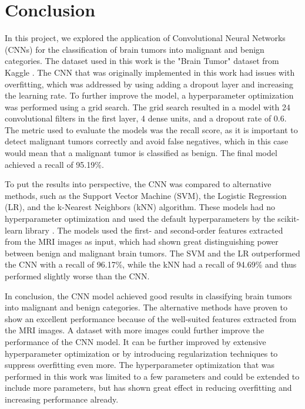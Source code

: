 \chapter{Conclusion}
\label{cha:conclusion}

In this project, we explored the application of Convolutional Neural Networks (CNNs) for the classification of brain tumors into malignant and benign categories.
The dataset used in this work is the "Brain Tumor" dataset from Kaggle \cite{jakesh_bohaju_2020}.
The CNN that was originally implemented in this work had issues with overfitting, which was addressed by using adding a dropout layer and increasing the learning rate.
To further improve the model, a hyperparameter optimization was performed using a grid search.
The grid search resulted in a model with 24 convolutional filters in the first layer, 4 dense units, and a dropout rate of 0.6.
The metric used to evaluate the models was the recall score, as it is important to detect malignant tumors correctly and avoid false negatives, which in this case would mean that a malignant tumor is classified as benign.
The final model achieved a recall of 95.19\%. \newline %

To put the results into perspective, the CNN was compared to alternative methods, such as the Support Vector Machine (SVM), the Logistic Regression (LR), and the k-Nearest Neighbors (kNN) algorithm.
These models had no hyperparameter optimization and used the default hyperparameters by the scikit-learn library \cite{scikit-learn}.
The models used the first- and second-order features extracted from the MRI images as input, which had shown great distinguishing power between benign and malignant brain tumors.
The SVM and the LR outperformed the CNN with a recall of 96.17\%, while the kNN had a recall of 94.69\% and thus performed slightly worse than the CNN.

In conclusion, the CNN model achieved good results in classifying brain tumors into malignant and benign categories.
The alternative methods have proven to show an excellent performance because of the well-suited features extracted from the MRI images.
A dataset with more images could further improve the performance of the CNN model.
It can be further improved by extensive hyperparameter optimization or by introducing regularization techniques to suppress overfitting even more.
The hyperparameter optimization that was performed in this work was limited to a few parameters and could be extended to include more parameters, but has shown great effect in reducing overfitting and increasing performance already.


